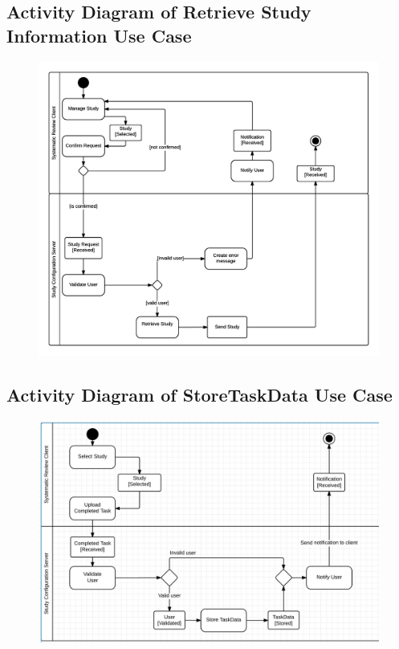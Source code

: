 \subsection{ Activity Diagram of Retrieve Study Information Use Case}
  \begin{figure}[H]
  \includegraphics[width=45em]{section/DynamicModel/Actovity_Diagram_Retrieve_StudyInformation}
  \label{fig: Activity Diagram of Retrieve Study Information Use Case}
\end{figure}

\subsection{ Activity Diagram of StoreTaskData Use Case}
\begin{figure}[H]
  \includegraphics[width=45em]{section/DynamicModel/Activity_Diagram_StoreTaskData}
  \label{fig: Activity Diagram of StoreTaskData Use Casefail}
\end{figure}

